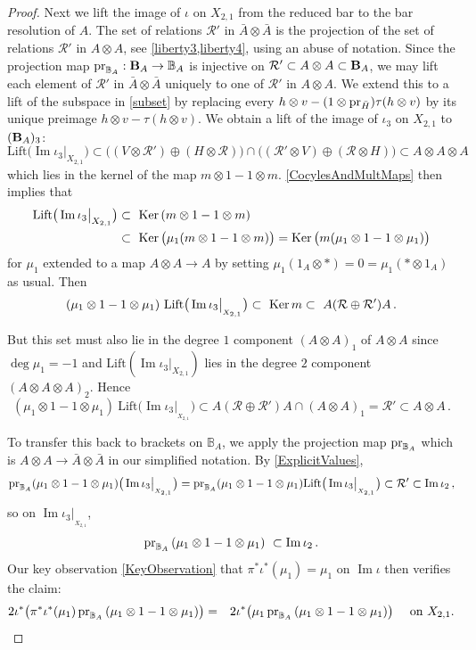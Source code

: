 \documentclass[11pt]{amsart}
\numberwithin{equation}{section}
\DeclareMathOperator{\Ima}{Im}
\DeclareMathOperator{\ima}{Im}
\newcommand{\bA}{\bar{\A}}
\newcommand{\A}{A}%
\newcommand{\pr}{ {\rm{pr}} }%
\newcommand{\sA}{A }
\newcommand{\R}{\mathcal{R}}
\newcommand{\B}{{\bf B}} %
\newcommand{\BB}{\mathbb{B}} %
\renewcommand{\_}[1]{\mbox{$_{\left( #1 \right)}$}}
\renewcommand{\ker}{\mbox{\rm Ker\,}}
\newcommand{\ot}{\otimes}
\begin{document}
{\begin{proof}
Next we lift the image of $\iota$ on $X_{2,1}$
from the reduced bar to the bar resolution of $A$.
The set of relations $\R'$ in $\bA\ot\bA$ 
is the projection of the set of relations $\R'$ in $A\ot A$,
see \cref{liberty3,liberty4},
using an abuse of notation.
Since the projection map $\pr_{\BB_A}: \B_A\rightarrow \BB_{A}$
is injective on $\R'\subset A\ot A\subset \B_A$,
we may lift each element of $\R'$ in $\bA\ot \bA$ uniquely to one of $\R'$ in $A\ot A$.
We extend this to a lift of the subspace in \cref{subset}
by replacing 
every 
 $h\ot v-(1\ot \pr_{\bar H})\tau(h\ot v)$ by 
 its unique preimage $h\ot v-\tau(h\ot v)$.
 We obtain a lift of the
 image of $\iota_3$ on $X_{2,1}$
 to $(\B_A)_3$:
 $$\text{Lift}\big(\ima\iota_3\big|_{X_{2,1}}\big)
 \subset  
 \big( (V\ot \R')\oplus (H\ot \R) \big) 
  \cap 
  \big( (\R' \ot V)\oplus (\R\ot H ) \big)  
  \subset A\ot A  \ot A
  $$
  which
   lies in the kernel of the map $m\ot 1-1\ot m$.
  \cref{CocylesAndMultMaps} then implies that
$$
\begin{aligned}
\text{Lift} \big(\ima\iota_3\big|_{X_{2,1}}\big)
&\subset\
\ker (m\ot 1 -1\ot m)\\
&\subset\ \ker \big(\mu_1(m\ot 1 -1\ot m)\big)
=
\ker \big(m(\mu_1\ot 1 - 1\ot \mu_1)\big)
\end{aligned}
$$
for $\mu_1$ extended to a map $A\ot A\rightarrow A$
by setting $\mu_1(1_A\ot *)=0=\mu_1(*\ot 1_A)$ as usual.
Then 
$$
(\mu_1\ot 1 - 1\ot \mu_1) \ \text{Lift} \big(\ima\iota_3\big|_{_{X_{2,1}}}\big)
\subset\ 
\ker m
\subset\ A (\R\oplus \R')A%
\, .
$$
 
But this set must also lie in 
the degree $1$ component $(A\ot A)_1$
of $A\ot A$ since
$\deg\mu_1=-1$ and $\text{Lift}(\ima\iota_3|_{X_{2,1}})$ lies in the degree
$2$ component $(A\ot A\ot A)_2$.
Hence
$$
(\mu_1\ot 1 - 1\ot \mu_1)\ \text{Lift}\big(\ima\iota_3\big|_{_{X_{2,1}}}\big)
\subset A(\R\oplus \R')A \cap (A\ot A)_1
= \R'
\subset A\ot A
\, .
$$

To transfer this back to brackets on $\BB_A$, we
apply the projection map $\pr_{\BB_A}$
which is $A\ot A\rightarrow \bA\ot \bA$ in our simplified notation.
By \cref{ExplicitValues},
$$\pr_{\BB_A}
(\mu_1\ot 1 - 1\ot \mu_1)
\big(\ima\iota_3\big|_{_{X_{2,1}}}\big)
=
\pr_{\BB_A}
(\mu_1\ot 1 - 1\ot \mu_1)
\text{Lift}\big(\ima\iota_3\big|_{_{X_{2,1}}}\big)
\subset \R' \subset \ima\iota_2
\, ,
$$
so on $\ima\iota_3\big|_{_{X_{2,1}}}$,
$$
 \pr_{\BB_A}\, 
(\mu_1\ot 1 - 1\ot \mu_1)\
\subset \ima\iota_2
\, .
$$
Our key observation \cref{KeyObservation} that
$\pi^*\iota^*(\mu_1)=\mu_1$
on $\Ima\iota$ then verifies
the claim:
\label{SupressProjectionInBrackets}
\begin{eqnarray*}
  2\iota^* \big(\pi^*\iota^*(\mu_1) \, \pr_{\BB_A}\,
  (\mu_1\ot 1 - 1\ot \mu_1)\big)
  & = & 
        2\iota^*\big(\mu_1 \, \pr_{\BB_A}\, (\mu_1\ot 1 - 1\ot \mu_1)\big)
        \quad\text{ on $X_{2,1}$.}
\end{eqnarray*}


\end{proof}}
\end{document}
